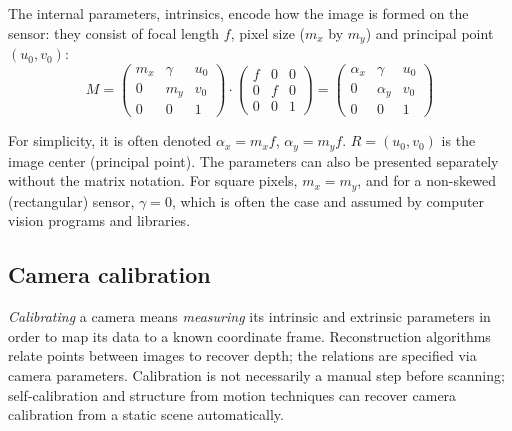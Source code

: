 
The internal parameters, intrinsics, encode how the image is formed on the sensor: they consist of focal length $f$, pixel size ($m_x$ by $m_y$) and principal point $(u_0, v_0)$:
\begin{equation}
	M =
	\begin{pmatrix}
		m_x & \gamma & u_0\\
		0   &    m_y & v_0\\
		0   &        0 & 1
	\end{pmatrix}
\cdot
	\begin{pmatrix}
		f & 0 & 0\\
		0 & f & 0\\
		0 & 0 & 1
	\end{pmatrix}
	=
	\begin{pmatrix}
		\alpha_x & \gamma   & u_0\\
		0        & \alpha_y & v_0\\
		0        & 0        & 1
	\end{pmatrix}
\end{equation}

For simplicity, it is often denoted $\alpha_x = m_x f$, $\alpha_y = m_y f$.
$R = (u_0, v_0)$ is the image center (principal point).
The parameters can also be presented separately without the matrix notation.
For square pixels, $m_x = m_y$, and for a non-skewed (rectangular) sensor, $\gamma = 0$, which is often the case and assumed by computer vision programs and libraries. \cite{hartley03multiview,szeliski10vision,heyden2005multiple}



\subsection{Camera calibration} %

\emph{Calibrating} a camera means \emph{measuring} its intrinsic and extrinsic parameters in order to map its data to a known coordinate frame.
Reconstruction algorithms relate points between images to recover depth; the relations are specified via camera parameters.
Calibration is not necessarily a manual step before scanning;
self-calibration and structure from motion techniques can recover camera calibration from a static scene automatically. \cite{pollefeys1999hand,hartley03multiview}

